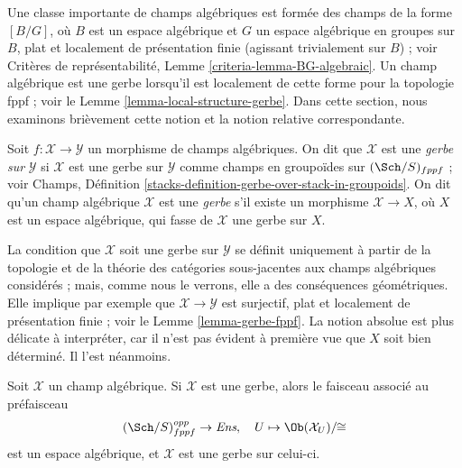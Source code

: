 \noindent
Une classe importante de champs algébriques est formée des champs de la forme
$[B/G]$, où $B$ est un espace algébrique et $G$ un espace algébrique en groupes
sur $B$, plat et localement de présentation finie (agissant trivialement sur
$B$) ; voir Critères de représentabilité, Lemme
\ref{criteria-lemma-BG-algebraic}. Un champ algébrique est une gerbe lorsqu'il
est localement de cette forme pour la topologie fppf ; voir le
Lemme \ref{lemma-local-structure-gerbe}. Dans cette section, nous examinons
brièvement cette notion et la notion relative correspondante.

\begin{definition}
\label{definition-gerbe}
Soit $f : \mathcal{X} \to \mathcal{Y}$ un morphisme de champs algébriques.
On dit que $\mathcal{X}$ est une {\it gerbe sur} $\mathcal{Y}$ si
$\mathcal{X}$ est une gerbe sur $\mathcal{Y}$ comme champs en
groupoïdes sur $(\Sch/S)_{fppf}$ ; voir Champs, Définition
\ref{stacks-definition-gerbe-over-stack-in-groupoids}. On dit qu'un champ
algébrique $\mathcal{X}$ est une {\it gerbe} s'il existe un morphisme
$\mathcal{X} \to X$, où $X$ est un espace algébrique, qui fasse de
$\mathcal{X}$ une gerbe sur $X$.
\end{definition}

\noindent
La condition que $\mathcal{X}$ soit une gerbe sur $\mathcal{Y}$ se
définit uniquement à partir de la topologie et de la théorie des catégories
sous-jacentes aux champs algébriques considérés ; mais, comme nous le verrons,
elle a des conséquences géométriques. Elle implique par exemple que
$\mathcal{X} \to \mathcal{Y}$ est surjectif, plat et localement de présentation
finie ; voir le Lemme \ref{lemma-gerbe-fppf}. La notion absolue est plus
délicate à interpréter, car il n'est pas évident à première vue que $X$ soit
bien déterminé. Il l'est néanmoins.

\begin{lemma}
\label{lemma-gerbe-over-iso-classes}
Soit $\mathcal{X}$ un champ algébrique. Si $\mathcal{X}$ est une gerbe, alors
le faisceau associé au préfaisceau
$$
(\Sch/S)_{fppf}^{opp} \to \textit{Ens}, \quad
U \mapsto \Ob(\mathcal{X}_U)/\!\!\cong
$$
est un espace algébrique, et $\mathcal{X}$ est une gerbe sur celui-ci.
\end{lemma}

